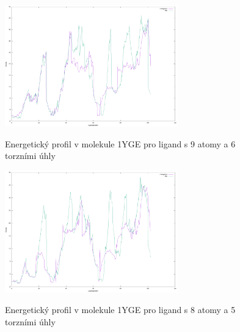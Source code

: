 \begin{figure}[ht]
\centering
\begin{minipage}{.5\textwidth}
  \centering
    \includegraphics[width=75mm]{img/1YGE_energy_0.png}
    \caption{Energetický profil v molekule 1YGE pro ligand s 9 atomy a 6 torzními úhly}
  \centering
  \label{fig:1YGE_energy_0}
\end{minipage}%
\begin{minipage}{.5\textwidth}
     \centering
    \includegraphics[width=75mm]{img/1YGE_energy_1.png}
    \caption{Energetický profil v molekule 1YGE pro ligand s 8 atomy a 5 torzními úhly}
  \centering
  \label{fig:1YGE_energy_1}
\end{minipage}
\end{figure}

